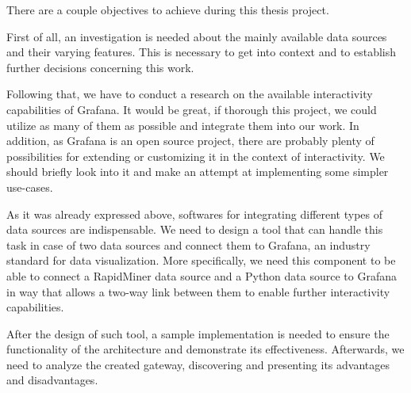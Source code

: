

There are a couple objectives to achieve during this thesis project.

First of all, an investigation is needed about the mainly available data sources and their varying features. This is necessary to get into context and to establish further decisions concerning this work.

Following that, we have to conduct a research on the available interactivity capabilities of Grafana. It would be great, if thorough this project, we could utilize as many of them as possible and integrate them into our work. In addition, as Grafana is an open source project, there are probably plenty of possibilities for extending or customizing it in the context of interactivity. We should briefly look into it and make an attempt at implementing some simpler use-cases.

As it was already expressed above, softwares for integrating different types of data sources are indispensable. We need to design a tool that can handle this task in case of two data sources and connect them to Grafana, an industry standard for data visualization. More specifically, we need this component to be able to connect a RapidMiner data source and a Python data source to Grafana in way that allows a two-way link between them to enable further interactivity capabilities.

After the design of such tool, a sample implementation is needed to ensure the functionality of the architecture and demonstrate its effectiveness. Afterwards, we need to analyze the created gateway, discovering and presenting its advantages and disadvantages.





